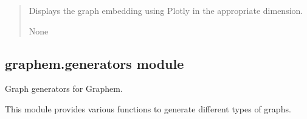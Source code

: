 \documentclass[letterpaper,10pt,english]{sphinxmanual}
\begin{document}
\begin{fulllineitems}
\begin{fulllineitems}
\begin{quote}
\begin{description}
\begin{itemize}
\end{itemize}

\sphinxAtStartPar
Displays the graph embedding using Plotly in the appropriate dimension.

\sphinxAtStartPar
None

\end{description}\end{quote}

\end{fulllineitems}


\end{fulllineitems}



\subsection{graphem.generators module}
\label{\detokenize{api_reference:module-0}}\label{\detokenize{api_reference:graphem-generators-module}}
\sphinxAtStartPar
Graph generators for Graphem.

\sphinxAtStartPar
This module provides various functions to generate different types of graphs.
\end{document}
